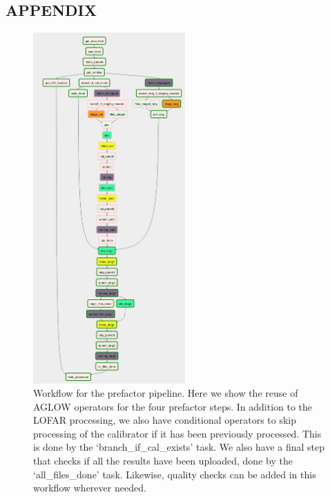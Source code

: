 \begin{subappendices}

\section*{APPENDIX}
 
\begin{figure}[!ht]
 \centering
 \includegraphics[width=0.52\textwidth]{ch5/figures/SKSP_Dag1.png}
 \caption{Workflow for the prefactor pipeline. Here we show the reuse of AGLOW operators for the four prefactor steps. In addition to the LOFAR processing, we also have conditional operators to skip processing of the calibrator if it has been previously processed. This is done by the `branch\_if\_cal\_exists' task. We also have a final step that checks if all the results have been uploaded, done by the `all\_files\_done' task. Likewise, quality checks can be added in this workflow wherever needed.}
 \label{SKSP_workflow}
\end{figure}


\end{subappendices}
